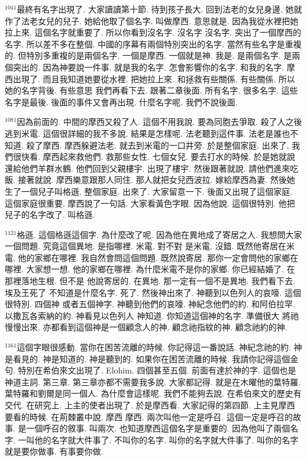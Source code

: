 \documentclass{book}
\begin{document}
$^{1041}$最終有名字出現了.
大家讀讀第十節.
待到孩子長大.
回到法老的女兒身邊.
她就作了法老女兒的兒子.
她給他取了個名字.
叫做摩西.
意思就是.
因為我從水裡把她拉上來.
這個名字就重要了.
所以你看到沒名字.
沒名字 沒名字.
突出了一個摩西的名字.
所以差不多在整個.
中國的序幕有兩個特別突出的名字.
當然有些名字是重複的.
但特別多重複的是兩個名字.
一個是摩西.
一個就是神.
我是.
是兩個名字.
是兩個突出的.
因為神要說一件事.
就是我的名字.
怎會影響你的名字.
和我的名字.
摩西出現了.
而且我知道她要從水裡.
把她拉上來.
和拯救有些關係.
有些關係.
所以她的名字背後.
有些意思 我們再看下去.
跟著二章後面.
所有名字.
很多名字.
這些名字是最後.
後面的事件又會再出現.
什麼名字呢.
我們不說後面.

$^{1081}$因為前面的.
中間的摩西又殺了人.
這個不用我說.
要為同胞去爭取.
殺了人之後逃到米電.
這個很詳細的我不多說.
結果是怎樣呢.
法老聽到這件事.
法老是誰也不知道.
殺了摩西.
摩西躲避法老.
就去到米電的一口井旁.
於是整個家庭.
出來了.
我們很快看.
摩西起來救他們.
救那些女性.
七個女兒.
要去打水的時候.
於是她就說還給他們羊群水鶴.
他們回到父親樓宇.
出現了樓宇.
然後跟著就說.
請他們進來吃飯.
接著就說.
摩西樂意跟那人同住.
那人就把女兒西波拉.
嫁給摩西為妻.
然後她生了一個兒子叫格遜.
整個家庭.
出來了.
大家留意一下.
後面又出現了這個家庭.
這個家庭很重要.
摩西說了一句話.
大家看黃色字眼.
因為他說.
這個很特別.
他把兒子的名字改了.
叫格遜.

$^{1121}$格遜.
這個格遜這個字.
為什麼改了呢.
因為他在異地成了寄居之人.
我想問大家一個問題.
究竟這個異地.
是指哪裡.
米電.
對不對 是米電.
沒錯.
既然他寄居在米電.
他的家鄉在哪裡.
我自然會問這個問題.
既然說寄居.
那你一定會問他的家鄉在哪裡.
大家想一想.
他的家鄉在哪裡.
為什麼米電不是你的家鄉.
你已經結婚了.
在那裡落地生根.
但不是 他說寄居的.
在異地.
那一定有一個不是異地.
我們看下去.
埃及王死了 不知道是什麼名字.
死了.
然後神出來了.
神聽到以色列人的哀嚎.
這個很特別.
四個神 或者五個神字.
神聽到他們的哀嚎.
神紀念他們的約.
和阿伯拉罕.
以撒瓦各索納的約.
神看見以色列人 神知道.
你知道這個神的名字.
準備很大 將祂慢慢出來.
亦都看到這個神是一個顧念人的神.
顧念祂指紋的神.
顧念祂約的神.

$^{1161}$這個字眼很感動.
當你在困苦流離的時候.
你記得這一番說話.
神紀念祂的約.
神是看見的.
神是知道的.
神是聽到的.
如果你在困苦流離的時候.
我請你記得這個金句.
特別在希伯來文出現了.
Elohim.
四個甚至五個.
前面有達於神的字.
這個也是神道主詞.
第三章.
第三章亦都不需要我多說.
大家都記得.
就是在木曜他的葉特羅.
葉特羅和劉爾是同一個人.
為什麼會這樣呢.
我們不能夠去說.
在希伯來文的歷史有交代.
在研究上.
上主的使者出現了.
於是摩西看.
大家記得的第四節.
上主見摩西要看的時候.
在荊棘叢中說.
摩西 摩西.
兩次叫他一定是呼召.
這個一定是呼召的故事.
是一個呼召的敘事.
叫兩次.
也知道摩西這個名字是重要的.
因為他叫了兩個名字.
一叫他的名字就大件事了.
不叫你的名字.
叫你的名字就大件事了.
叫你的名字就是要你做事.
有事要你做.
\end{document}
